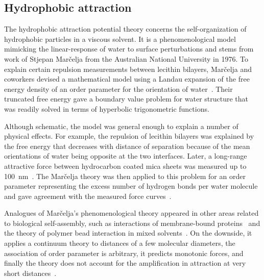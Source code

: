 \subsection{Hydrophobic attraction}
The hydrophobic attraction potential theory concerns the self-organization of
hydrophobic particles in a viscous solvent. It is a phenomenological
model mimicking the linear-response of water to surface perturbations
and stems from work of Stjepan Mar\v{c}elja
from the Australian National University in 1976. To explain certain
repulsion measurements between lecithin bilayers, Mar\v{c}elja and
coworkers devised a mathematical model using a Landau expansion of the
free energy density of an order parameter for the orientation of
water~\cite{LeRaPa77, MaRa76, LANDAULIFSHITZ5}. Their truncated free
energy gave a boundary value problem for water structure that was
readily solved in terms of hyperbolic trigonometric functions. 

Although schematic, the model was general enough to explain a number of
physical effects. For example, the repulsion of lecithin bilayers
was explained by the free energy that decreases with distance of
separation because of the mean orientations of water being opposite at
the two interfaces. Later, a long-range attractive force between
hydrocarbon coated mica sheets was measured up to
100~nm~\cite{ClCh88,RaDe88}. The Mar\v{c}elja
theory was then applied to this problem for an order parameter
representing the excess number of hydrogen bonds per water
molecule and gave agreement with the measured force
curves~\cite{ErLjCl89}.


Analogues of Mar\v{c}elja's phenomenological theory appeared in other
areas related to biological self-assembly, such as interactions of
membrane-bound proteins~\cite{KoNa15, Nagle17, KUZMIN2005} and the
theory of polymer bead interaction in mixed solvents~\cite{deGe76}. On
the downside, it applies a continuum theory to distances of a few
molecular diameters, the association of order parameter is arbitrary, it
predicts monotonic forces, and finally the theory does not account for
the amplification in attraction at very short distances~\cite{Ni80}.

